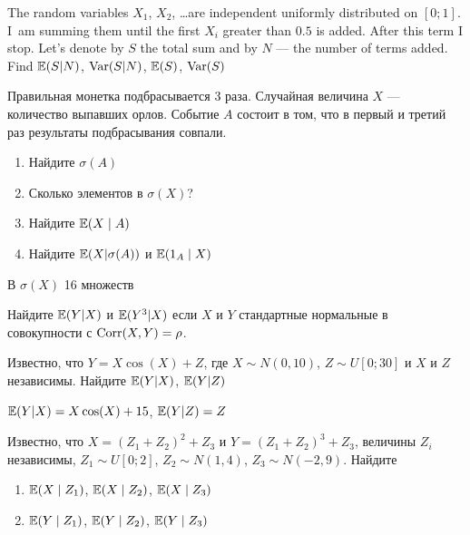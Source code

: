 \begin{solution}
\begin{solution}
\begin{solution}
\begin{solution}
\begin{solution}
\begin{solution}
\begin{solution}
\begin{problem}
The random variables $X_1$, $X_2$, \ldots are independent uniformly distributed on $[0;1]$. I~am summing them until the first $X_i$ greater than $0.5$ is added. After this term I stop. Let's denote by $S$ the total sum and by $N$ --- the number of terms added. Find $\mathbb{E}(S|N)$, $\operatorname{Var}(S|N)$, $\mathbb{E}(S)$, $\operatorname{Var}(S)$
\end{problem} 
\begin{solution} 

\end{solution}

\begin{problem}
 Правильная монетка подбрасывается 3 раза. Случайная величина $X$ --- количество выпавших орлов. Событие $A$ состоит в том, что в первый и третий раз результаты подбрасывания совпали. 
\begin{enumerate}
\item Найдите $\sigma(A)$
\item Сколько элементов в $\sigma(X)$?
\item Найдите $\mathbb{E}(X\mid A)$
\item Найдите $\mathbb{E}(X|\sigma(A))$ и $\mathbb{E}(1_A \mid X)$
\end{enumerate}
\end{problem} 
\begin{solution} 
 В $\sigma(X)$ 16 множеств
\end{solution}

\begin{problem}
Найдите $\mathbb{E}(Y|X)$ и $\mathbb{E}(Y^3|X)$ если $X$ и $Y$ стандартные нормальные в совокупности с $\operatorname{Corr}(X,Y)=\rho$.
\end{problem} 
\begin{solution} 

\end{solution}

\begin{problem}
Известно, что $Y=X\cos(X)+Z$, где $X\sim N(0,10)$, $Z\sim U[0;30]$ и $X$ и $Z$ независимы. Найдите $\mathbb{E}(Y|X)$, $\mathbb{E}(Y|Z)$
\end{problem} 
\begin{solution} 
$\mathbb{E}(Y|X)=X\cos(X)+15$, $\mathbb{E}(Y|Z)=Z$
\end{solution}

\begin{problem}
Известно, что $X=(Z_1+Z_2)^2+Z_3$ и $Y=(Z_1+Z_2)^3+Z_3$, величины $Z_i$ независимы, $Z_1\sim U[0;2]$, $Z_2\sim N(1,4)$, $Z_3\sim N(-2,9)$. Найдите 
\begin{enumerate}
\item $\mathbb{E}(X \mid Z_1)$, $\mathbb{E}(X \mid Z_2)$, $\mathbb{E}(X \mid Z_3)$
\item $\mathbb{E}(Y \mid Z_1)$, $\mathbb{E}(Y \mid Z_2)$, $\mathbb{E}(Y \mid Z_3)$
\end{enumerate}


\end{problem}
\end{solution}
\end{solution}
\end{solution}
\end{solution}
\end{solution}
\end{solution}
\end{solution}
